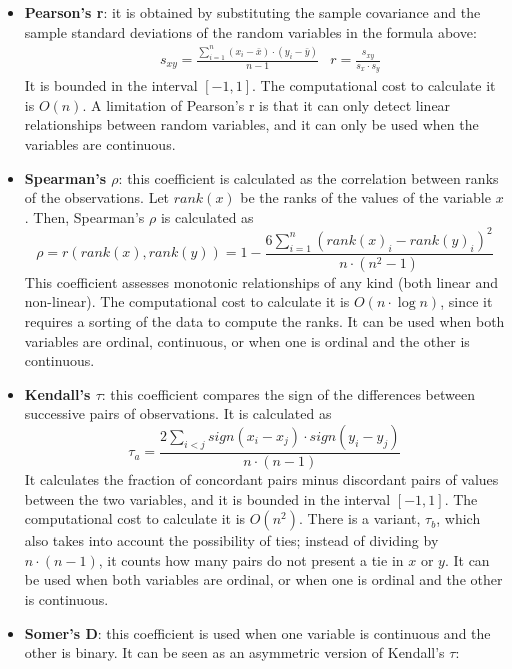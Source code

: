 \begin{itemize}
    \item \textbf{Pearson's r}: it is obtained by substituting the sample covariance and the sample standard deviations of the random variables in the formula above:
    \begin{align*}
        &s_{xy} = \frac{\sum_{i=1}^n (x_i - \bar{x}) \cdot (y_i - \bar{y})}{n-1} &r = \frac{s_{xy}}{s_x \cdot s_y}
    \end{align*}
    It is bounded in the interval $[-1,1]$. The computational cost to calculate it is $O(n)$. A limitation of Pearson's r is that it can only detect linear relationships between random variables, and it can only be used when the variables are continuous.
    \item \textbf{Spearman's $\rho$}: this coefficient is calculated as the correlation between ranks of the observations. Let $\textit{rank}(x)$ be the ranks of the values of the variable $x$. Then, Spearman's $\rho$ is calculated as
    \begin{equation*}
        \rho = r(\textit{rank}(x), \textit{rank}(y)) = 1 - \frac{6 \sum_{i=1}^n (rank(x)_i - rank(y)_i)^2}{n\cdot(n^2 - 1)} 
    \end{equation*}
    This coefficient assesses monotonic relationships of any kind (both linear and non-linear). The computational cost to calculate it is $O(n \cdot \log n)$, since it requires a sorting of the data to compute the ranks. It can be used when both variables are ordinal, continuous, or when one is ordinal and the other is continuous.
    \item \textbf{Kendall's $\tau$}: this coefficient compares the sign of the differences between successive pairs of observations. It is calculated as
    \begin{equation*}
        \tau_a = \frac{2 \sum_{i<j} \textit{sign}(x_i - x_j) \cdot \textit{sign}(y_i - y_j)}{n \cdot (n-1)}
    \end{equation*}
    It calculates the fraction of concordant pairs minus discordant pairs of values between the two variables, and it is bounded in the interval $[-1,1]$. The computational cost to calculate it is $O(n^2)$. There is a variant, $\tau_b$, which also takes into account the possibility of ties; instead of dividing by $n \cdot (n-1)$, it counts how many pairs do not present a tie in $x$ or $y$. It can be used when both variables are ordinal, or when one is ordinal and the other is continuous.
    \item \textbf{Somer's D}: this coefficient is used when one variable is continuous and the other is binary. It can be seen as an asymmetric version of Kendall's $\tau$:

\end{itemize}
